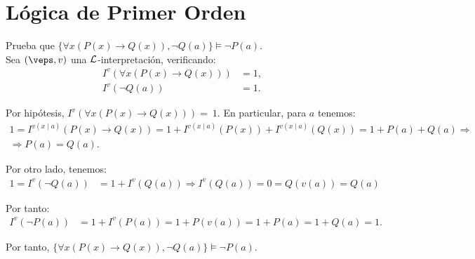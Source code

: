 \section{Lógica de Primer Orden}

\begin{ejercicio}\label{ej:2.1}
    Prueba que $\{\forall x(P(x) \rightarrow Q(x)), \neg Q(a)\} \models \neg P(a)$.\\

    Sea $(\veps,v)$ una $\mathcal{L}$-interpretación, verificando:
    \begin{align*}
        I^v(\forall x(P(x) \rightarrow Q(x))) &= 1,\\
        I^v(\neg Q(a)) &= 1.
    \end{align*}

    Por hipótesis, $I^v(\forall x(P(x) \rightarrow Q(x))) =~1$. En particular, para $a$ tenemos:
    \begin{multline*}
        1 = I^{v(x\mid a)}(P(x) \rightarrow Q(x))
        = 1+I^{v(x\mid a)}(P(x))+I^{v(x\mid a)}(Q(x))=1+P(a)+Q(a)
        \Longrightarrow \\ \Longrightarrow P(a) = Q(a).
    \end{multline*}
    
    
    Por otro lado, tenemos:
    \begin{align*}
        1 = I^v(\neg Q(a)) &= 1+I^v(Q(a))\Longrightarrow I^v(Q(a)) = 0
        = Q(v(a)) = Q(a)
    \end{align*}

    Por tanto:
    \begin{align*}
        I^v(\neg P(a)) &= 1+I^v(P(a)) = 1+P(v(a)) = 1+P(a) = 1+Q(a) = 1.
    \end{align*}

    Por tanto, $\{\forall x(P(x) \rightarrow Q(x)), \neg Q(a)\} \models \neg P(a)$.
\end{ejercicio}

